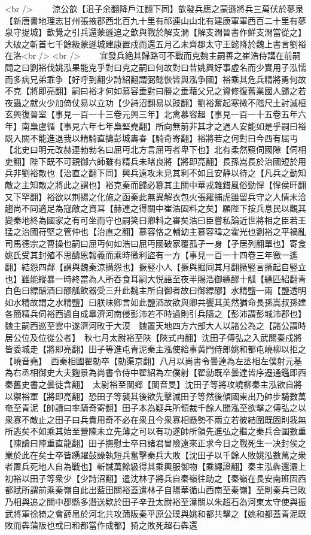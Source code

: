<br />
　　涼公歆【沮子余翻降戶江翻下同】歆發兵應之蒙遜將兵三萬伏於蓼泉【新唐書地理志甘州張掖郡西北百九十里有祁連山山北有建康軍軍西百二十里有蓼泉守捉城】歆覺之引兵還蒙遜追之歆與戰於解支澗【解支澗晉書作鮮支澗當從之】大破之斬首七千餘級蒙遜城建康置戍而還五月乙未齊郡太守王懿降於魏上書言劉裕在洛<br />
<br />
　　宜發兵絶其歸路可不戰而克魏主嗣善之崔浩侍講在前嗣問之曰劉裕伐姚泓果能克乎對曰克之嗣曰何故對曰昔姚興好事虛名而少實用子泓懦而多病兄弟乖争【好呼到翻少詩紹翻謂弼懿恢皆與泓争國】裕乘其危兵精將勇何故不克【將即亮翻】嗣曰裕才何如慕容垂對曰勝之垂藉父兄之資修復舊業國人歸之若夜蟲之就火少加倚仗易以立功【少詩沼翻易以豉翻】劉裕奮起寒微不階尺土討滅桓玄興復晉室【事見一百一十三卷元興三年】北禽慕容超【事見一百一十五卷五年六年】南梟盧循【事見六年七年梟堅堯翻】所向無前非其才之過人安能如是乎嗣曰裕既入關不能進退我以精騎直擣彭城夀春【騎奇寄翻】裕將若之何對曰今西有屈丏【北史曰明元改赫連勃勃名曰屈丏北方言屈丏者卑下也】北有柔然窺伺國隙【伺相吏翻】陛下既不可親御六師雖有精兵未睹良將【將即亮翻】長孫嵩長於治國短於用兵非劉裕敵也【治直之翻下同】興兵遠攻未見其利不如且安静以待之【凡兵之動知敵之主知敵之將此之謂也】裕克秦而歸必簒其主關中華戎雜錯風俗勁悍【悍侯旰翻又下罕翻】裕欲以荆揚之化施之函秦此無異解衣包火張羅捕虎雖留兵守之人情未洽趨尚不同適足為寇敵之資耳【赫連之得關中崔浩固料之矣】願陛下按兵息民以觀其變秦地終為國家之有可坐而守也嗣笑曰卿料之審矣浩曰臣嘗私論近世將相之臣若王猛之治國苻堅之管仲也【治直之翻】慕容恪之輔幼主慕容暐之霍光也劉裕之平禍亂司馬德宗之曹操也嗣曰屈丏何如浩曰屈丏國破家覆孤孑一身【孑居列翻單也】寄食姚氏受其封殖不思醻恩報義而乘時徼利盜有一方【事見一百一十四卷三年徼一遙翻】結怨四鄰【謂與魏秦涼搆怨也】撅竪小人【撅與掘同其月翻撅竪言撅起自竪立也】雖能縱暴一時終當為人所吞食耳嗣大悦語至夜半賜浩御縹醪十觚【縹匹紹翻青白色曰縹醅酒曰醪觚飲器受三升此魏主所自御者故曰御縹醪】水精鹽一兩【鹽透明如水精故謂之水精鹽】曰朕味卿言如此鹽酒故欲與卿共饗其美然猶命長孫嵩叔孫建各簡精兵伺裕西過自成臯濟河南侵彭沛若不時過則引兵隨之【彭沛謂彭城沛郡也】　魏主嗣西巡至雲中遂濟河畋于大漠　魏置天地四方六部大人以諸公為之【諸公謂時居公位及位從公者】　秋七月太尉裕至陜【陜式冉翻】沈田子傅弘之入武關秦戍將皆委城走【將即亮翻】田子等進屯青泥秦主泓使給事黄門侍郎姚和都屯嶢柳以拒之【嶢音堯】　西秦相國翟勍卒【勍渠京翻】八月以尚書令曇達為左丞相左僕射元基為右丞相御史大夫麴景為尚書令侍中翟紹為左僕射【翟勍既卒曇達皆序遷通鑑即西秦舊史書之曇徒含翻】　太尉裕至閺鄉【閺音旻】沈田子等將攻嶢柳秦主泓欲自將以禦裕軍【將即亮翻】恐田子等襲其後欲先擊滅田子等然後傾國東出乃帥步騎數萬奄至青泥【帥讀曰率騎奇寄翻】田子本為疑兵所領裁千餘人聞泓至欲擊之傅弘之以衆寡不敵止之田子曰兵貴用奇不必在衆且今衆寡相懸勢不兩立若彼結圍既固則我無所逃矣不如乘其始至營陳未立先薄之可以有功遂帥所領先進弘之繼之秦兵合圍數重【陳讀曰陣重直龍翻】田子撫慰士卒曰諸君冒險遠來正求今日之戰死生一决封侯之業於此在矣士卒皆踴躍鼔譟執短兵奮擊秦兵大敗【沈田子以千餘人敗姚泓數萬之衆者置兵死地人自為戰也】斬馘萬餘級得其乘輿服御物【乘繩證翻】秦主泓犇還灞上初裕以田子等衆少【少詩沼翻】遣沈林子將兵自秦嶺往助之【秦嶺在長安南班固西都賦所謂前乘秦嶺自此出藍田關裕蓋遣林子自陽華循山西南至秦嶺】至則秦兵已敗乃相與追之關中郡縣多潛送欵於田子辛丑太尉裕至潼關以朱超石為河東太守使與振武將軍徐猗之會薛帛於河北共攻蒲阪秦平原公璞與姚和都共擊之【姚和都蓋青泥既敗而犇蒲阪也或曰和都當作成都】猗之敗死超石犇還